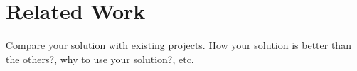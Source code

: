 

\chapter{Related Work} %
Compare your solution with existing projects. How your solution is better than the others?, why to use your solution?, etc.




\ifpdf
    \graphicspath{{8/figures/PNG/}{8/figures/PDF/}{8/figures/}}
\else
    \graphicspath{{8/figures/EPS/}{8/figures/}}
\fi





 




 






